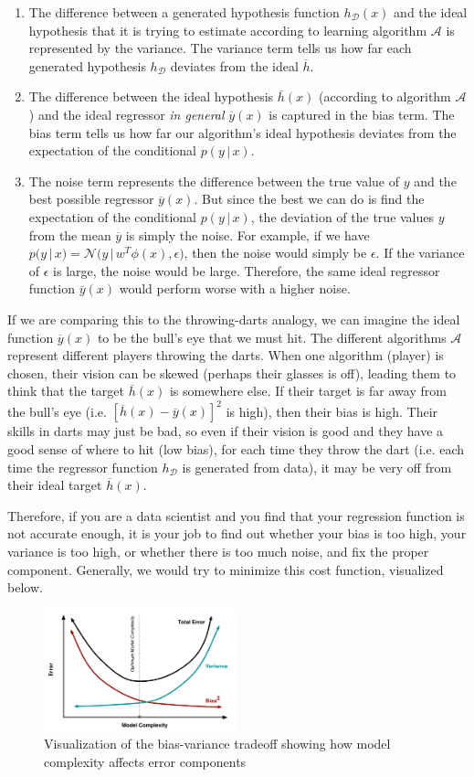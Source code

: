   \begin{enumerate}
    \item The difference between a generated hypothesis function $h_\mathcal{D}(x)$ and the ideal hypothesis that it is trying to estimate according to learning algorithm $\mathcal{A}$ is represented by the variance. The variance term tells us how far each generated hypothesis $h_\mathcal{D}$ deviates from the ideal $\overline{h}$.
    
    \item The difference between the ideal hypothesis $\overline{h}(x)$ (according to algorithm $\mathcal{A}$) and the ideal regressor \textit{in general} $\overline{y}(x)$ is captured in the bias term. The bias term tells us how far our algorithm's ideal hypothesis deviates from the expectation of the conditional $p(y\,|\,x)$.
    
    \item The noise term represents the difference between the true value of $y$ and the best possible regressor $\overline{y}(x)$. But since the best we can do is find the expectation of the conditional $p(y\,|\,x)$, the deviation of the true values $y$ from the mean $\overline{y}$ is simply the noise. For example, if we have $p(y\,|\,x) = \mathcal{N} \big( y\,|\, w^T\phi(x), \epsilon \big)$, then the noise would simply be $\epsilon$. If the variance of $\epsilon$ is large, the noise would be large. Therefore, the same ideal regressor function $\overline{y}(x)$ would perform worse with a higher noise.
  \end{enumerate}

  If we are comparing this to the throwing-darts analogy, we can imagine the ideal function $\overline{y}(x)$ to be the bull's eye that we must hit. The different algorithms $\mathcal{A}$ represent different players throwing the darts. When one algorithm (player) is chosen, their vision can be skewed (perhaps their glasses is off), leading them to think that the target $\overline{h}(x)$ is somewhere else. If their target is far away from the bull's eye (i.e. $[\overline{h}(x) - \overline{y}(x)]^2$ is high), then their bias is high. Their skills in darts may just be bad, so even if their vision is good and they have a good sense of where to hit (low bias), for each time they throw the dart (i.e. each time the regressor function $h_\mathcal{D}$ is generated from data), it may be very off from their ideal target $\overline{h}(x)$.

  Therefore, if you are a data scientist and you find that your regression function is not accurate enough, it is your job to find out whether your bias is too high, your variance is too high, or whether there is too much noise, and fix the proper component. Generally, we would try to minimize this cost function, visualized below.

  \begin{figure}[H]
    \centering
    \includegraphics[width=0.5\textwidth]{img/biasvariance.png}
    \caption{Visualization of the bias-variance tradeoff showing how model complexity affects error components}
  \end{figure}

